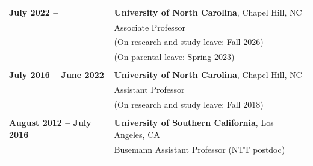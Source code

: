\documentclass[10pt]{article}
\begin{document}
\smallskip

{
\begin{tabular}{l l}
{\bf July 2022 -- } & {\bf University of North Carolina}, Chapel Hill, NC \\
& {Associate Professor}\\
& {(On research and study leave: Fall 2026)}\\
& {(On parental leave: Spring 2023)}\\ \\

{\bf July 2016 -- June 2022} & {\bf University of North Carolina}, Chapel Hill, NC \\
& {Assistant Professor}\\ 
& {(On research and study leave: Fall 2018)}\\ \\

{\bf August 2012 -- July 2016} & {\bf University of Southern California}, Los Angeles, CA \\
& {Busemann Assistant Professor (NTT postdoc)}\\
\\
\end{tabular}
}


%
%
%
\end{document}
